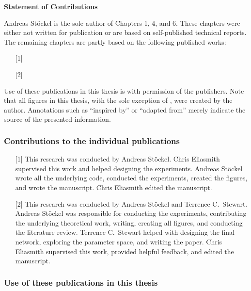 \begin{center}\textbf{Statement of Contributions}\end{center}

Andreas Stöckel is the sole author of Chapters 1, 4, and 6.
These chapters were either not written for publication or are based on self-published technical reports.
The remaining chapters are partly based on the following published works:

\begin{enumerate}
	\item[{[1]}] 
	\item[{[2]}] 
\end{enumerate}

\noindent Use of these publications in this thesis is with permission of the publishers.
Note that all figures in this thesis, with the sole exception of , were created by the author.
Annotations such as \enquote{inspired by} or \enquote{adapted from} merely indicate the source of the presented information.

\subsubsection{Contributions to the individual publications}

\begin{enumerate}
	\item[{[1]}] This research was conducted by Andreas Stöckel.
	Chris Eliasmith supervised this work and helped designing the experiments.
	Andreas Stöckel wrote all the underlying code, conducted the experiments, created the figures, and wrote the manuscript.
	Chris Eliasmith edited the manuscript.
	\item[{[2]}] This research was conducted by Andreas Stöckel and Terrence C.~Stewart.
	Andreas Stöckel was responsible for conducting the experiments, contributing the underlying theoretical work, writing, creating all figures, and conducting the literature review.
	Terrence C.~Stewart helped with designing the final network, exploring the parameter space, and writing the paper.
	Chris Eliasmith supervised this work, provided helpful feedback, and edited the manuscript.
\end{enumerate}

\subsubsection{Use of these publications in this thesis}

